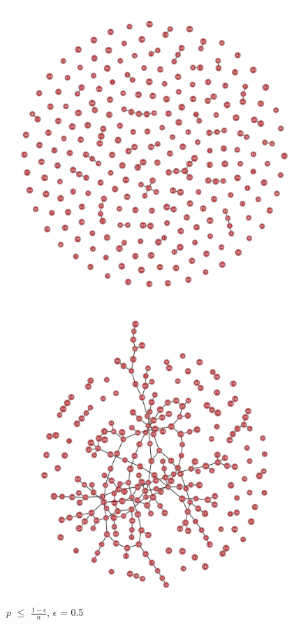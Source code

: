 \documentclass{article}
\begin{document}
\begin{figure}[!htb]
  \includegraphics[width=\linewidth]{ER_Examples/ER_SP.png}
  \caption*{$p$ $\leq$ $\frac{1-\epsilon}{n}$, $\epsilon$ = 0.5}
\endminipage\hfill
{}
  \includegraphics[width=\linewidth]{ER_Examples/ER_GC.png}

\end{figure}
\end{document}
